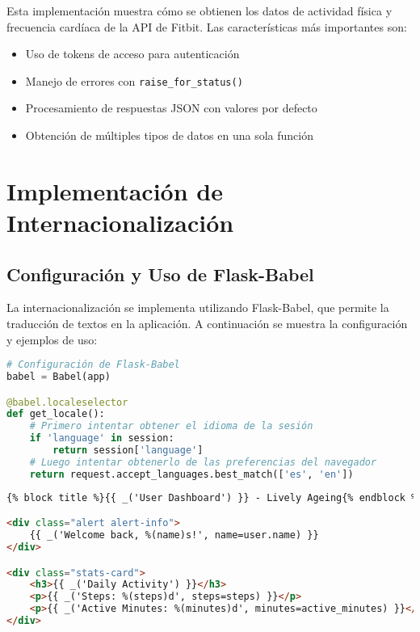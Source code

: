 Esta implementación muestra cómo se obtienen los datos de actividad física y frecuencia cardíaca de la API de Fitbit. Las características más importantes son:

\begin{itemize}
    \item Uso de tokens de acceso para autenticación
    \item Manejo de errores con \texttt{raise\_for\_status()}
    \item Procesamiento de respuestas JSON con valores por defecto
    \item Obtención de múltiples tipos de datos en una sola función
\end{itemize}

\section{Implementación de Internacionalización}
\label{sec:anexo_i18n}

\subsection{Configuración y Uso de Flask-Babel}
La internacionalización se implementa utilizando Flask-Babel, que permite la traducción de textos en la aplicación. A continuación se muestra la configuración y ejemplos de uso:

\begin{lstlisting}[language=Python, caption=Configuración de Flask-Babel]
# Configuración de Flask-Babel
babel = Babel(app)

@babel.localeselector
def get_locale():
    # Primero intentar obtener el idioma de la sesión
    if 'language' in session:
        return session['language']
    # Luego intentar obtenerlo de las preferencias del navegador
    return request.accept_languages.best_match(['es', 'en'])
\end{lstlisting}

\begin{lstlisting}[language=HTML, caption=Ejemplo de uso en plantillas]
{% block title %}{{ _('User Dashboard') }} - Lively Ageing{% endblock %}

<div class="alert alert-info">
    {{ _('Welcome back, %(name)s!', name=user.name) }}
</div>

<div class="stats-card">
    <h3>{{ _('Daily Activity') }}</h3>
    <p>{{ _('Steps: %(steps)d', steps=steps) }}</p>
    <p>{{ _('Active Minutes: %(minutes)d', minutes=active_minutes) }}</p>
</div>
\end{lstlisting}


